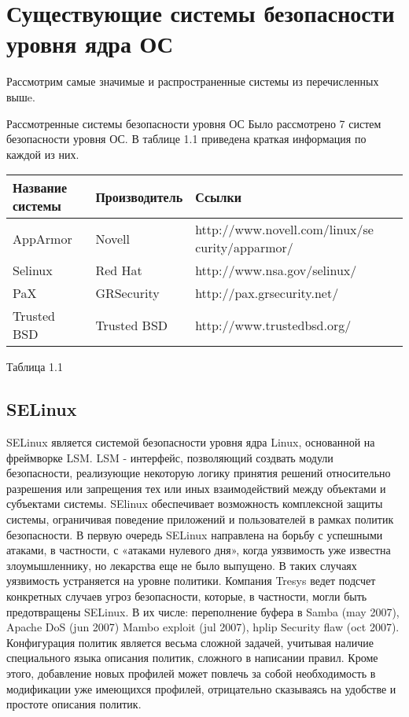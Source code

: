 \section{Существующие системы безопасности уровня ядра ОС}

\bigskip
Рассмотрим самые значимые и распространенные системы из
 перечисленных вышe.


Рассмотренные системы безопасности уровня ОС 
Было рассмотрено 7 систем безопасности уровня ОС. 
В таблице 1.1 приведена краткая информация по каждой из них. 

\bigskip
\begin{tabular}{|p{4cm}|p{3cm}|p{6cm}|}
\hline
Название системы & Производитель & Ссылки \\
\hline
AppArmor & Novell & http://www.novell.com/linux/se
curity/apparmor/ \\
\hline
Selinux & Red Hat & http://www.nsa.gov/selinux/\\
\hline
PaX & GRSecurity & http://pax.grsecurity.net/\\
\hline
Trusted BSD & Trusted BSD & http://www.trustedbsd.org/\\
\hline
\end{tabular}

Таблица 1.1
\bigskip 
\subsection{SELinux} 
SELinux является системой безопасности 
уровня ядра Linux, основанной на 
фреймворке LSM. LSM - интерфейс, позволяющий 
создвать модули безопасности, реализующие 
некоторую логику принятия решений относительно
разрешения или запрещения тех или иных 
взаимодействий между объектами и субъектами 
системы. SElinux обеспечивает возможность 
комплексной защиты системы, ограничивая поведение 
приложений и пользователей в рамках политик 
безопасности. В первую очередь SELinux 
направлена на борьбу с успешными атаками, 
в частности, с «атаками нулевого дня», когда 
уязвимость уже известна злоумышленнику, 
но лекарства еще не было выпущено. В таких 
случаях уязвимость устраняется на уровне 
политики. Компания Tresys ведет подсчет 
конкретных случаев угроз безопасности, которые, 
в частности, могли быть предотвращены SELinux. 
В их числе: переполнение буфера в Samba (may 
2007), Apache DoS (jun 2007) Mambo exploit (jul 
2007), hplip Security flaw (oct 2007). 
Конфигурация политик является 
весьма сложной задачей, учитывая наличие специального
языка описания политик, сложного в написании правил.
Кроме этого, добавление новых профилей может повлечь 
за собой необходимость в модификации уже имеющихся 
профилей, отрицательно сказываясь на удобстве и 
простоте описания политик. 


